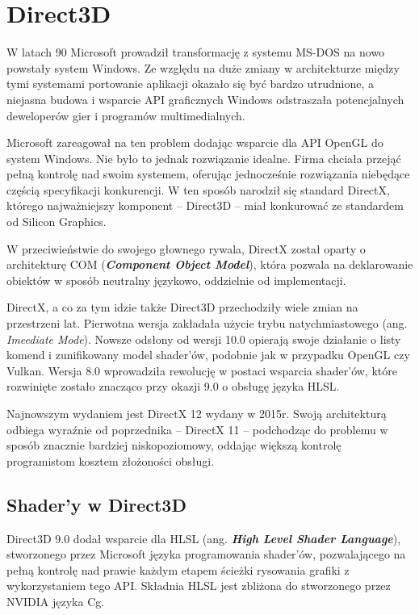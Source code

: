 \chapter{Direct3D}

W latach 90 Microsoft prowadził transformację z systemu MS-DOS na nowo
powstały system Windows. Ze względu na duże zmiany w architekturze
między tymi systemami portowanie aplikacji okazało się być bardzo
utrudnione, a niejasna budowa i wsparcie API graficznych Windows
odstraszała potencjalnych deweloperów gier i programów multimedialnych.

Microsoft zareagował na ten problem dodając wsparcie dla API OpenGL do
system Windows. Nie było to jednak rozwiązanie idealne. Firma chciała
przejąć pełną kontrolę nad swoim systemem, oferując jednocześnie
rozwiązania niebędące częścią specyfikacji konkurencji. W ten sposób
narodził się standard DirectX, którego najważniejszy komponent --
Direct3D -- miał konkurować ze standardem od Silicon Graphics.

W przeciwieństwie do swojego głownego rywala, DirectX został oparty o
architekturę COM (\emph{\textbf{Component Object Model}}), która pozwala
na deklarowanie obiektów w sposób neutralny językowo, oddzielnie od
implementacji.

DirectX, a co za tym idzie także Direct3D przechodziły wiele zmian na
przestrzeni lat. Pierwotna wersja zakładała użycie trybu
natychmiastowego (ang. \emph{Imeediate Mode}). Nowsze odsłony od wersji
10.0 opierają swoje działanie o listy komend i zunifikowany model
shader'ów, podobnie jak w przypadku OpenGL czy Vulkan. Wersja 8.0
wprowadziła rewolucję w postaci wsparcia shader'ów, które rozwinięte
zostało znacząco przy okazji 9.0 o obsługę języka HLSL. \cite{wiki:direct3d:2024}

Najnowszym wydaniem jest DirectX 12 wydany w 2015r. Swoją architekturą
odbiega wyraźnie od poprzednika -- DirectX 11 -- podchodząc do problemu
w sposób znacznie bardziej niskopoziomowy, oddając większą kontrolę
programistom kosztem złożoności obsługi.


\section{Shader'y w Direct3D} %

Direct3D 9.0 dodał wsparcie dla HLSL (ang. \emph{\textbf{High Level Shader Language}}), stworzonego przez Microsoft języka programowania shader'ów, pozwalającego na pełną kontrolę nad prawie każdym etapem ścieżki rysowania grafiki z wykorzystaniem tego API. Składnia HLSL jest zbliżona do stworzonego przez NVIDIA języka Cg.

